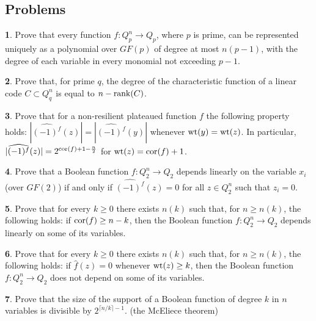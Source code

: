\documentclass[11pt]{article}
\theoremstyle{definition}
\newtheorem{exercise}{\quad}
\newcommand{\rank}{{\rm rank}}
\newcommand{\wt}{{\rm wt}}
\newcommand{\cor}{{\rm cor}}
\begin{document}
{{{\subsection{Problems}


\begin{exercise}
Prove that every
function
$f:Q_p^n\rightarrow Q_p$,
where $p$ is prime, can be represented uniquely as a polynomial over
$GF(p)$ of degree at most $n(p-1)$, with the degree of each variable
in every monomial not exceeding $p-1$.
\end{exercise}

\begin{exercise}
Prove that, for prime $q$, the degree of the characteristic function of
a linear code $C\subset Q_q^n$ is equal to $n-\rank(C)$.
\end{exercise}

\begin{exercise}
Prove that for a non-resilient plateaued function $f$ the following
property holds:
$
|\widehat{(-1)^f}(z)|=|\widehat{(-1)^f}(y)|
$
whenever $\wt(y)=\wt(z)$. In particular,
$
|\widehat{(-1)^f}(z)|
=2^{\cor(f)+1-\frac n2}
$
for $\wt(z)=\cor(f)+1$.
\end{exercise}

\begin{exercise}
Prove that a Boolean function
$f:Q_2^n\rightarrow Q_2$ depends linearly  on the variable $x_i$
(over $GF(2)$) if and only if
$\widehat{(-1)^f}(z)=0$
for all $z\in Q_2^n$ such that $z_i=0$.
\end{exercise}

\begin{exercise}
Prove that for every $k\geq0$ there exists $n(k)$ such that, for
$n\geq n(k)$, the following holds: if
$\cor(f)\geq n-k$,
then the Boolean function
$f:Q_2^n\rightarrow Q_2$ depends linearly on some of its variables.
\end{exercise}

\begin{exercise}
Prove that for every $k\geq0$ there exists $n(k)$ such that, for
$n\geq n(k)$, the following holds: if
$\widehat{f}(z)=0$
whenever $\wt(z)\geq k$, then the Boolean function
$f:Q_2^n\rightarrow Q_2$ does not depend on some of its variables.
\end{exercise}

\begin{exercise}
Prove that the size of the support of a Boolean function of degree $k$
in $n$ variables is divisible by
$2^{\lceil n/k\rceil-1}$.
(the McEliece theorem)
\end{exercise}

}}}
\end{document}
